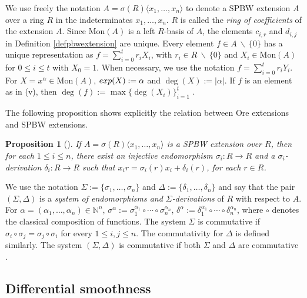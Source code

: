 \documentclass{amsart}
\newtheorem{proposition}[theorem]{Proposition}
\theoremstyle{definition}
\theoremstyle{remark}
\numberwithin{equation}{section}
\begin{document}
We use freely the notation $A = \sigma(R)\langle x_1,\dotsc, x_n\rangle$ to denote a SPBW extension $A$ over a ring $R$ in the indeterminates $x_1, \dotsc, x_n$. $R$ is called the {\em ring of coefficients} of the extension $A$. Since $\text{Mon}(A)$ is a left $R$-basis of $A$, the elements $c_{i,r}$ and $d_{i,j}$ in Definition \ref{defpbwextension} are unique. Every element $f \in A\  \backslash\ \{0\}$ has a unique representation as $f = \sum_{i=0}^tr_iX_i$, with $r_i \in R\ \backslash\ \{0\}$ and $X_i \in \text{Mon}(A)$ for $0 \leq i \leq t$ with $X_0=1$. When necessary, we use the notation $f = \sum_{i=0}^tr_iY_i$. For $X=x^{\alpha}\in\text{Mon}(A)$, ${\rm exp}(X):=\alpha$ and $\deg(X):=|\alpha|$. If $f$ is an element as in (v), then $\deg(f):=\max\{\deg(X_i)\}_{i=1}^t$ \cite[Remark 2 and Definition 6]{GallegoLezama2011}.

The following proposition shows explicitly the relation between Ore extensions and SPBW extensions.

\begin{proposition}[{\cite[Proposition 3]{GallegoLezama2011}}]\label{GallegoLezama2011Proposition3}
If $A = \sigma(R)\langle x_1,\dotsc, x_n\rangle$ is a SPBW extension over $R$, then for each $1 \leq i \leq n$, there exist an injective endomorphism $\sigma_i : R \to R$ and a $\sigma_i$-derivation $\delta_i: R \to R$ such that $x_ir = \sigma_i(r)x_i + \delta_i(r)$, for each $r\in R$.  
\end{proposition}

We use the notation $\Sigma:=\{\sigma_1,\dots,\sigma_n\}$ and $\Delta:=\{\delta_1,\dots,\delta_n\}$ and say that the pair $(\Sigma, \Delta)$ is a \textit{system of endomorphisms and $\Sigma$-derivations} of $R$ with respect to $A$. For $\alpha = (\alpha_1, \dots , \alpha_n) \in \mathbb{N}^n$, $\sigma^{\alpha}:= \sigma_1^{\alpha_1}\circ \cdots \circ \sigma_n^{\alpha_n}$, $\delta^{\alpha} := \delta_1^{\alpha_1} \circ \cdots \circ \delta_n^{\alpha_n}$, where $\circ$ denotes the classical composition of functions. The system $\Sigma$ is commutative if $\sigma_i \circ \sigma_j = \sigma_j \circ \sigma_i$ for every $1 \le i, j \le n$. The commutativity for $\Delta$ is defined similarly. The system $(\Sigma, \Delta)$ is commutative if both $\Sigma$ and $\Delta$ are commutative \cite[Definition 2.1]{LezamaAcostaReyes2015}.


\subsection{Differential smoothness}\label{DefinitionsandpreliminariesDSA}
\end{document}
